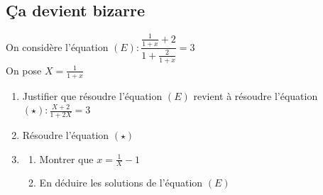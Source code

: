 \documentclass[oneside,12pt]{article}          %
\begin{document}
\subsection{Ça devient bizarre}
On considère l'équation $(E):\dfrac{\frac{1}{1+x}+2}{1+\frac{2}{1+x}}=3$ \\
On pose $X=\frac{1}{1+x}$
\begin{enumerate}
	\item Justifier que résoudre l'équation $(E)$ revient à résoudre l'équation $(\star):\frac{X+2}{1+2X}=3$
	\item Résoudre l'équation $(\star)$
	\item \begin{enumerate}
		\item Montrer que $x=\frac{1}{X}-1$
		\item En déduire les solutions de l'équation $(E)$
	\end{enumerate}
\end{enumerate}
\end{document}
